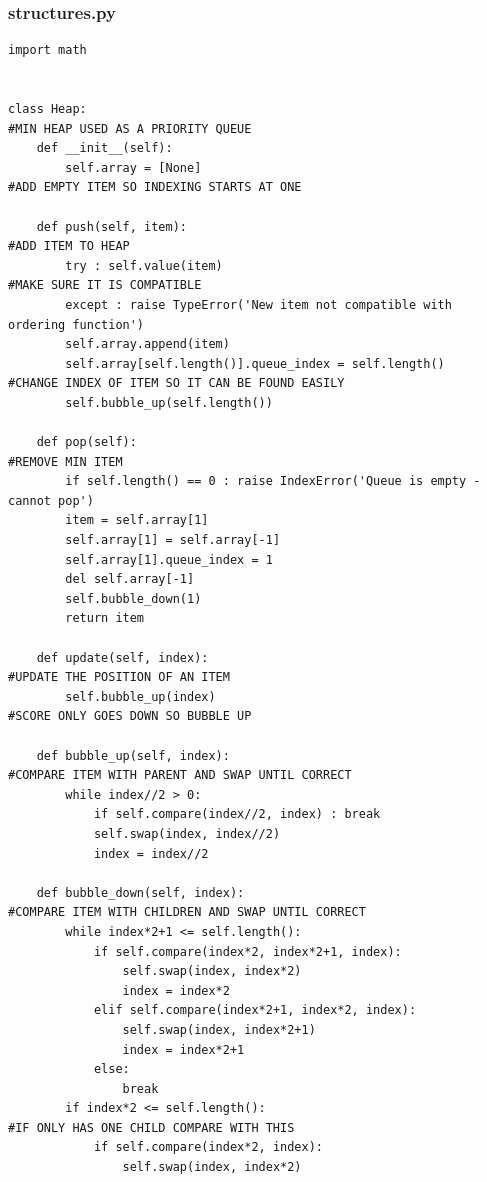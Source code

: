 \documentclass[titlepage]{article}
\begin{document}
\subsubsection{structures.py}
\begin{changemargin}{-1in}{-1in} 
\begin{verbatim}
import math
    
    
class Heap:                                                                     #MIN HEAP USED AS A PRIORITY QUEUE
    def __init__(self):                                                         
        self.array = [None]                                                     #ADD EMPTY ITEM SO INDEXING STARTS AT ONE
        
    def push(self, item):                                                       #ADD ITEM TO HEAP
        try : self.value(item)                                                  #MAKE SURE IT IS COMPATIBLE
        except : raise TypeError('New item not compatible with ordering function')
        self.array.append(item)
        self.array[self.length()].queue_index = self.length()                   #CHANGE INDEX OF ITEM SO IT CAN BE FOUND EASILY
        self.bubble_up(self.length())

    def pop(self):                                                              #REMOVE MIN ITEM
        if self.length() == 0 : raise IndexError('Queue is empty - cannot pop')
        item = self.array[1]
        self.array[1] = self.array[-1]
        self.array[1].queue_index = 1
        del self.array[-1]
        self.bubble_down(1)
        return item
    
    def update(self, index):                                                    #UPDATE THE POSITION OF AN ITEM
        self.bubble_up(index)                                                   #SCORE ONLY GOES DOWN SO BUBBLE UP

    def bubble_up(self, index):                                                 #COMPARE ITEM WITH PARENT AND SWAP UNTIL CORRECT
        while index//2 > 0:
            if self.compare(index//2, index) : break
            self.swap(index, index//2)
            index = index//2

    def bubble_down(self, index):                                               #COMPARE ITEM WITH CHILDREN AND SWAP UNTIL CORRECT
        while index*2+1 <= self.length():
            if self.compare(index*2, index*2+1, index):
                self.swap(index, index*2)
                index = index*2
            elif self.compare(index*2+1, index*2, index):
                self.swap(index, index*2+1)
                index = index*2+1
            else:
                break
        if index*2 <= self.length():                                            #IF ONLY HAS ONE CHILD COMPARE WITH THIS
            if self.compare(index*2, index):
                self.swap(index, index*2)


\end{verbatim}
\end{changemargin}
\end{document}
